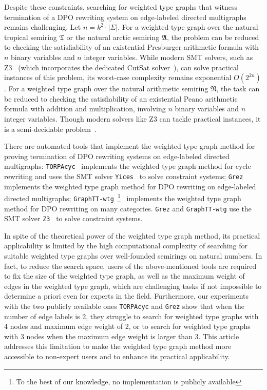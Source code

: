     Despite these constraints, searching for weighted type graphs that witness termination of a DPO rewriting system on edge-labeled directed multigraphs
    remains challenging. 
    Let $n = k^2 \cdot | \Sigma |$.
    For a weighted type graph over the natural tropical semiring $\mathfrak{T}$ or the natural arctic semiring $\mathfrak{A}$, the problem can be reduced to checking the satisfiability of an existential Presburger arithmetic formula with $n$ binary variables and $n$ integer variables.
    While modern SMT solvers, such as Z3~\cite{arithmetic2024z3} (which incorporates the dedicated CutSat solver~\cite{z3ilp_cutsat}), can solve practical instances of this problem, its worst-case complexity remains exponential \( O(2^{2n}) \).
     For a weighted type graph over the natural arithmetic semiring $\mathfrak{N}$, the task can be reduced to checking the satisfiability of an existential Peano arithmetic formula with addition and multiplication, involving $n$ binary variables and $n$ integer variables. Though modern solvers like Z3 can tackle practical instances, it is a semi-decidable problem~\cite{matiyasevivc2003enumerable}.

    There are automated tools that implement the weighted type graph method for proving termination of DPO rewriting systems on edge-labeled directed multigraphs: 
    \texttt{TORPAcyc}~\cite{TORPAcyc} implements the weighted type graph method for cycle rewriting and uses the SMT solver \texttt{Yices}~\cite{yices} to solve constraint systems;
    \texttt{Grez}~\cite{grez} implements the weighted type graph method for DPO rewriting on edge-labeled directed multigraphs; \texttt{GraphTT-wtg}~\footnote{To the best of our knowledge, no implementation is publicly available}~\cite{endrullis2024generalized_arxiv_v3} implements the weighted type graph method for DPO rewriting on many categories.
    \texttt{Grez} and \texttt{GraphTT-wtg}
    use  the SMT solver \texttt{Z3}~\cite{de2008z3} to solve constraint systems.


    In spite of the theoretical power of the weighted type graph method, its practical applicability is limited by the high computational complexity of searching for suitable weighted type graphs over well-founded semirings on 
    natural numbers. In fact, to reduce the search space, users of the above-mentioned tools are required
     to fix the size of the weighted type graph, as well as the maximum weight of edges in the weighted type graph, which are challenging tasks if not impossible to determine a priori even for experts in the field. 
    Furthermore, our experiments with the two publicly available ones \texttt{TORPAcyc} and \texttt{Grez} show that when the number of edge labels is 2, they struggle to search for weighted type graphs with 4 nodes and maximum edge weight of 2, or to search for weighted type graphs with 3 nodes when the maximum edge weight is larger than 3. 
    This article addresses this limitation to make the weighted type graph method more accessible to non-expert users and to enhance its practical applicability.

